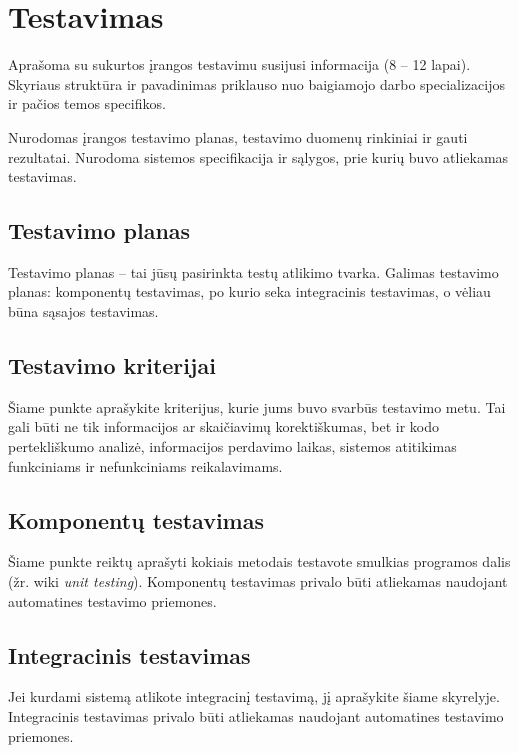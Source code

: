 \documentclass{ktuthesis}
\begin{document}
  \section{Testavimas}

  Aprašoma su sukurtos įrangos testavimu susijusi informacija (8 – 12 lapai). Skyriaus struktūra ir pavadinimas priklauso nuo baigiamojo darbo
  specializacijos ir pačios temos specifikos.

  Nurodomas įrangos testavimo planas, testavimo duomenų rinkiniai ir gauti rezultatai. Nurodoma sistemos specifikacija ir sąlygos, prie kurių
  buvo atliekamas testavimas.

  \subsection{Testavimo planas}

  Testavimo planas – tai jūsų pasirinkta testų atlikimo tvarka. Galimas testavimo planas: komponentų testavimas, po kurio seka integracinis
  testavimas, o vėliau būna sąsajos testavimas.

  \subsection{Testavimo kriterijai}

  Šiame punkte aprašykite kriterijus, kurie jums buvo svarbūs testavimo metu. Tai gali būti ne tik informacijos ar skaičiavimų korektiškumas,
  bet ir kodo pertekliškumo analizė, informacijos perdavimo laikas, sistemos atitikimas funkciniams ir nefunkciniams reikalavimams.

  \subsection{Komponentų testavimas}

  Šiame punkte reiktų aprašyti kokiais metodais testavote smulkias programos dalis (žr. wiki \textit{unit testing}). Komponentų testavimas privalo būti
  atliekamas naudojant automatines testavimo priemones.

  \subsection{Integracinis testavimas}

  Jei kurdami sistemą atlikote integracinį testavimą, jį aprašykite šiame skyrelyje. Integracinis testavimas privalo būti atliekamas naudojant automatines testavimo priemones.
\end{document}
